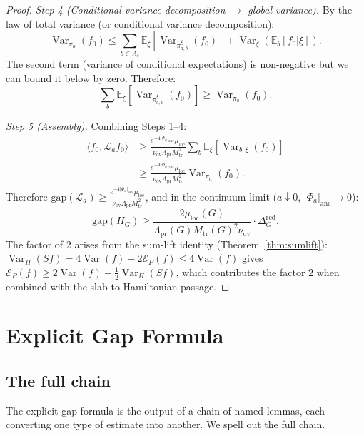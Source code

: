 \documentclass[12pt]{article}
\theoremstyle{plain}
\theoremstyle{definition}
\numberwithin{equation}{section}
\newcommand{\Var}{\operatorname{Var}}
\newcommand{\pr}{\mathrm{pr}}
\newcommand{\loc}{\mathrm{loc}}
\newcommand{\red}{\mathrm{red}}
\newcommand{\ov}{\mathrm{ov}}
\newcommand{\tr}{\mathrm{tr}}
\begin{document}
\begin{proof}
\emph{Step 4 (Conditional variance decomposition $\to$ global variance).}
By the law of total variance (or conditional variance decomposition):
\begin{equation}
\Var_{\pi_a}(f_0) \leq \sum_{b\in\Lambda_\ell}\mathbb{E}_\xi[\Var_{\pi_{a,b}^{\xi}}(f_0)] + \Var_\xi(\mathbb{E}_{b}[f_0|\xi]).
\end{equation}
The second term (variance of conditional expectations) is non-negative but we can bound it below by zero.  Therefore:
\begin{equation}
\sum_{b}\mathbb{E}_\xi[\Var_{\pi_{a,b}^{\xi}}(f_0)] \geq \Var_{\pi_a}(f_0).
\end{equation}

\emph{Step 5 (Assembly).}  Combining Steps 1--4:
\begin{align}
\langle f_0,\mathcal{L}_a f_0\rangle &\geq \frac{e^{-4|\Phi_a|_{\mathrm{anc}}}\mu_{\loc}}{\nu_{\ov}\Lambda_{\pr}M_{\tr}^2}\sum_b\mathbb{E}_\xi[\Var_{b,\xi}(f_0)]\\
&\geq \frac{e^{-4|\Phi_a|_{\mathrm{anc}}}\mu_{\loc}}{\nu_{\ov}\Lambda_{\pr}M_{\tr}^2}\Var_{\pi_a}(f_0).
\end{align}
Therefore $\mathrm{gap}(\mathcal{L}_a)\geq\frac{e^{-4|\Phi_a|_{\mathrm{anc}}}\mu_{\loc}}{\nu_{\ov}\Lambda_{\pr}M_{\tr}^2}$, and in the continuum limit ($a\downarrow 0$, $|\Phi_a|_{\mathrm{anc}}\to 0$):
\begin{equation}
\mathrm{gap}(H_G) \geq \frac{2\mu_{\loc}(G)}{\Lambda_{\pr}(G)M_{\tr}(G)^2\nu_{\ov}}\cdot\Delta_G^{\red}.
\end{equation}
The factor of $2$ arises from the sum-lift identity (Theorem~\ref{thm:sumlift}): $\Var_\Pi(Sf)=4\Var(f)-2\mathcal{E}_P(f)\leq 4\Var(f)$ gives $\mathcal{E}_P(f)\geq 2\Var(f)-\frac{1}{2}\Var_\Pi(Sf)$, which contributes the factor $2$ when combined with the slab-to-Hamiltonian passage.
\end{proof}


\section{Explicit Gap Formula}\label{sec:explicitgap}

\subsection{The full chain}

The explicit gap formula is the output of a chain of named lemmas, each converting one type of estimate into another.  We spell out the full chain.
\end{document}
